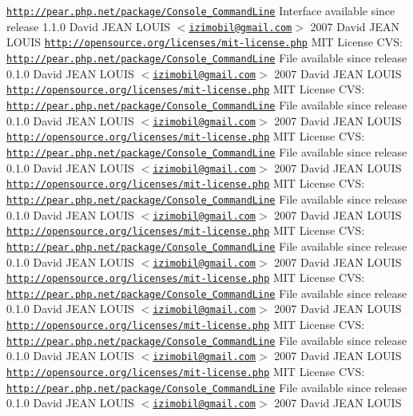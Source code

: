 \href{http://pear.php.net/package/Console_CommandLine}{\tt http://pear.php.net/package/Console\_\-CommandLine}  Interface available since release 1.1.0   David JEAN LOUIS $<$\href{mailto:izimobil@gmail.com}{\tt izimobil@gmail.com}$>$  2007 David JEAN LOUIS  \href{http://opensource.org/licenses/mit-license.php}{\tt http://opensource.org/licenses/mit-\/license.php} MIT License  CVS:   \href{http://pear.php.net/package/Console_CommandLine}{\tt http://pear.php.net/package/Console\_\-CommandLine}  File available since release 0.1.0    David JEAN LOUIS $<$\href{mailto:izimobil@gmail.com}{\tt izimobil@gmail.com}$>$  2007 David JEAN LOUIS  \href{http://opensource.org/licenses/mit-license.php}{\tt http://opensource.org/licenses/mit-\/license.php} MIT License  CVS:   \href{http://pear.php.net/package/Console_CommandLine}{\tt http://pear.php.net/package/Console\_\-CommandLine}  File available since release 0.1.0    David JEAN LOUIS $<$\href{mailto:izimobil@gmail.com}{\tt izimobil@gmail.com}$>$  2007 David JEAN LOUIS  \href{http://opensource.org/licenses/mit-license.php}{\tt http://opensource.org/licenses/mit-\/license.php} MIT License  CVS:   \href{http://pear.php.net/package/Console_CommandLine}{\tt http://pear.php.net/package/Console\_\-CommandLine}  File available since release 0.1.0    David JEAN LOUIS $<$\href{mailto:izimobil@gmail.com}{\tt izimobil@gmail.com}$>$  2007 David JEAN LOUIS  \href{http://opensource.org/licenses/mit-license.php}{\tt http://opensource.org/licenses/mit-\/license.php} MIT License  CVS:   \href{http://pear.php.net/package/Console_CommandLine}{\tt http://pear.php.net/package/Console\_\-CommandLine}  File available since release 0.1.0    David JEAN LOUIS $<$\href{mailto:izimobil@gmail.com}{\tt izimobil@gmail.com}$>$  2007 David JEAN LOUIS  \href{http://opensource.org/licenses/mit-license.php}{\tt http://opensource.org/licenses/mit-\/license.php} MIT License  CVS:   \href{http://pear.php.net/package/Console_CommandLine}{\tt http://pear.php.net/package/Console\_\-CommandLine}  File available since release 0.1.0    David JEAN LOUIS $<$\href{mailto:izimobil@gmail.com}{\tt izimobil@gmail.com}$>$  2007 David JEAN LOUIS  \href{http://opensource.org/licenses/mit-license.php}{\tt http://opensource.org/licenses/mit-\/license.php} MIT License  CVS:   \href{http://pear.php.net/package/Console_CommandLine}{\tt http://pear.php.net/package/Console\_\-CommandLine}  File available since release 0.1.0    David JEAN LOUIS $<$\href{mailto:izimobil@gmail.com}{\tt izimobil@gmail.com}$>$  2007 David JEAN LOUIS  \href{http://opensource.org/licenses/mit-license.php}{\tt http://opensource.org/licenses/mit-\/license.php} MIT License  CVS:   \href{http://pear.php.net/package/Console_CommandLine}{\tt http://pear.php.net/package/Console\_\-CommandLine}  File available since release 0.1.0    David JEAN LOUIS $<$\href{mailto:izimobil@gmail.com}{\tt izimobil@gmail.com}$>$  2007 David JEAN LOUIS  \href{http://opensource.org/licenses/mit-license.php}{\tt http://opensource.org/licenses/mit-\/license.php} MIT License  CVS:   \href{http://pear.php.net/package/Console_CommandLine}{\tt http://pear.php.net/package/Console\_\-CommandLine}  File available since release 0.1.0    David JEAN LOUIS $<$\href{mailto:izimobil@gmail.com}{\tt izimobil@gmail.com}$>$  2007 David JEAN LOUIS  